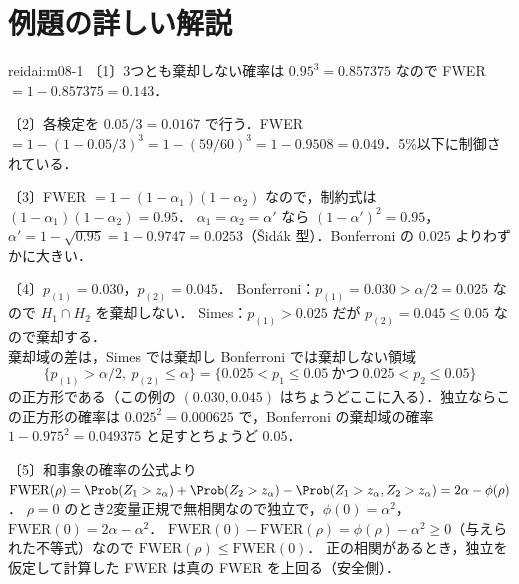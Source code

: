 \section{例題の詳しい解説}\label{sec:m08-kaisetsu}
\begin{kaitou}{reidai:m08-1}
〔1〕3つとも棄却しない確率は $0.95^3=0.857375$ なので FWER $=1-0.857375=0.143$．

〔2〕各検定を $0.05/3=0.0167$ で行う．FWER $=1-(1-0.05/3)^3=1-(59/60)^3=1-0.9508=0.049$．5\%以下に制御されている．

〔3〕FWER $=1-(1-\alpha_1)(1-\alpha_2)$ なので，制約式は $(1-\alpha_1)(1-\alpha_2)=0.95$．
$\alpha_1=\alpha_2=\alpha'$ なら $(1-\alpha')^2=0.95$，$\alpha'=1-\sqrt{0.95}=1-0.9747=0.0253$（Šidák 型）．Bonferroni の $0.025$ よりわずかに大きい．

〔4〕$p_{(1)}=0.030$，$p_{(2)}=0.045$．
Bonferroni：$p_{(1)}=0.030>\alpha/2=0.025$ なので $H_1\cap H_2$ を棄却しない．
Simes：$p_{(1)}>0.025$ だが $p_{(2)}=0.045\le0.05$ なので棄却する．\\
棄却域の差は，Simes では棄却し Bonferroni では棄却しない領域
\[
\{p_{(1)}>\alpha/2,\ p_{(2)}\le\alpha\}=\{0.025<p_1\le0.05\ \text{かつ}\ 0.025<p_2\le0.05\}
\]
の正方形である（この例の $(0.030,0.045)$ はちょうどここに入る）．独立ならこの正方形の確率は $0.025^2=0.000625$ で，Bonferroni の棄却域の確率 $1-0.975^2=0.049375$ と足すとちょうど $0.05$．

〔5〕和事象の確率の公式より
$\mathrm{FWER}(\rho)=\Prob(Z_1>z_\alpha)+\Prob(Z_2>z_\alpha)-\Prob(Z_1>z_\alpha,Z_2>z_\alpha)=2\alpha-\phi(\rho)$．
$\rho=0$ のとき2変量正規で無相関なので独立で，$\phi(0)=\alpha^2$，$\mathrm{FWER}(0)=2\alpha-\alpha^2$．
$\mathrm{FWER}(0)-\mathrm{FWER}(\rho)=\phi(\rho)-\alpha^2\ge0$（与えられた不等式）なので $\mathrm{FWER}(\rho)\le\mathrm{FWER}(0)$．
正の相関があるとき，独立を仮定して計算した FWER は真の FWER を上回る（安全側）．
\end{kaitou}

